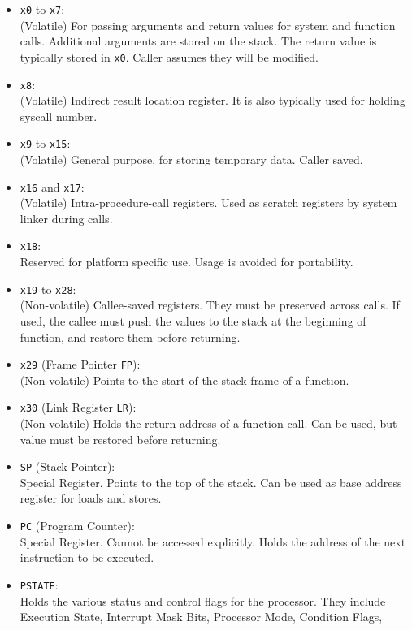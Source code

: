 \documentclass[a4paper, nobind]{templates/ociamthesis}
\providecommand{\tightlist}{%
  \setlength{\itemsep}{0pt}\setlength{\parskip}{0pt}}
\begin{document}
\begin{itemize}
\tightlist
\item
  \texttt{x0} to \texttt{x7}:\\
  (Volatile) For passing arguments and return values for system and function calls.
  Additional arguments are stored on the stack.
  The return value is typically stored in \texttt{x0}. Caller assumes they will be modified.
\item
  \texttt{x8}:\\
  (Volatile) Indirect result location register. It is also typically used for holding
  syscall number.
\item
  \texttt{x9} to \texttt{x15}:\\
  (Volatile) General purpose, for storing temporary data. Caller saved.
\item
  \texttt{x16} and \texttt{x17}:\\
  (Volatile) Intra-procedure-call registers. Used as scratch
  registers by system linker during calls.
\item
  \texttt{x18}:\\
  Reserved for platform specific use. Usage is avoided for portability.
\item
  \texttt{x19} to \texttt{x28}:\\
  (Non-volatile) Callee-saved registers. They must be preserved across calls.
  If used, the callee must push the values to the stack at the beginning of function,
  and restore them before returning.
\item
  \texttt{x29} (Frame Pointer \texttt{FP}):\\
  (Non-volatile) Points to the start of the stack frame of a function.
\item
  \texttt{x30} (Link Register \texttt{LR}):\\
  (Non-volatile) Holds the return address of a function call.
  Can be used, but value must be restored before returning.
\item
  \texttt{SP} (Stack Pointer):\\
  Special Register. Points to the top of the stack.
  Can be used as base address register for loads and stores.
\item
  \texttt{PC} (Program Counter):\\
  Special Register. Cannot be accessed explicitly.
  Holds the address of the next instruction to be executed.
\item
  \texttt{PSTATE}:\\
  Holds the various status and control flags for the processor.
  They include Execution State, Interrupt Mask Bits, Processor Mode, Condition Flags,
\end{itemize}
\end{document}
